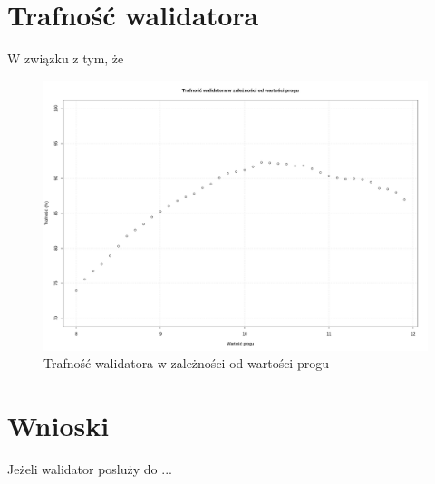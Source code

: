 \section{Trafność walidatora}

W związku z tym, że

\begin{figure}[H]
    \centering
    \includegraphics[width=1\textwidth]{images/trafnosc_walidator_a_prog}
    \caption{ Trafność walidatora w zależności od wartości progu }
    \customsource
    \label{fig:tranosc_walidatora_per_prog}
\end{figure}


\section{Wnioski}

Jeżeli walidator posluży do ...